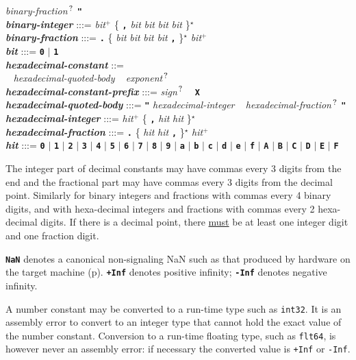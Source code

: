 \documentclass[12pt]{article}
\newcommand{\TT}[1]{{\tt \bfseries #1}}
\newcommand{\STAR}{{\Large $^\star$}}
\newcommand{\PLUS}[1][]{{$^{+#1}$}}
\newcommand{\QMARK}{{$^{\,\mbox{\footnotesize ?}}$}}
\newcommand{\emkey}[1]{{\em \bfseries #1}}
\newcommand{\pagref}[1]{p\pageref{#1}}
\newenvironment{indpar}[1][0.3in]%
	{\begin{list}{}%
		     {\setlength{\itemsep}{0in}%
		      \setlength{\topsep}{0in}%
		      \setlength{\parsep}{1ex}%
		      \setlength{\labelwidth}{#1}%
		      \setlength{\leftmargin}{#1}%
		      \addtolength{\leftmargin}{\labelsep}}%
	 \item}%
	{\end{list}}
\begin{document}
\begin{indpar}
				{\em binary-fraction}\QMARK{} \TT{"}
\\[0.5ex]
\emkey{binary-integer}
    :::= {\em bit}\PLUS{}
           \{ \TT{,} {\em bit} {\em bit} {\em bit} {\em bit} \}\STAR{} \\
\emkey{binary-fraction} :::=
    \TT{.} \{ {\em bit} {\em bit} {\em bit} {\em bit} \TT{,} \}\STAR{}
    {\em bit}\PLUS{} \\
\emkey{bit} :::= \TT{0} $|$ \TT{1}
 \\[0.5ex]
\emkey{hexadecimal-constant} ::= \\
\hspace*{0.5in}{\em hexadecimal-constant-prefix} ~
               {\em hexadecimal-quoted-body} ~
	       {\em exponent}\QMARK{}
\\[0.5ex]
\emkey{hexadecimal-constant-prefix} :::= {\em sign}\QMARK{} ~ \TT{X}
\\[0.5ex]
\emkey{hexadecimal-quoted-body} :::= \TT{"} {\em hexadecimal-integer} ~
				     {\em hexadecimal-fraction}\QMARK{} \TT{"}
\\[0.5ex]
\emkey{hexadecimal-integer}
    :::= {\em hit}\PLUS{}
           \{ \TT{,} {\em hit} {\em hit} \}\STAR{} \\
\emkey{hexadecimal-fraction} :::=
    \TT{.} \{ {\em hit} {\em hit} \TT{,} \}\STAR{}
    {\em hit}\PLUS{} \\
\emkey{hit} :::= \TT{0} $|$ \TT{1} $|$ \TT{2} $|$ \TT{3} $|$ \TT{4}
	     $|$ \TT{5} $|$ \TT{6} $|$ \TT{7} $|$ \TT{8} $|$ \TT{9}
	     $|$ \TT{a} $|$ \TT{b} $|$ \TT{c} $|$ \TT{d} $|$ \TT{e} $|$ \TT{f}
	     $|$ \TT{A} $|$ \TT{B} $|$ \TT{C} $|$ \TT{D} $|$ \TT{E} $|$ \TT{F}
\end{indpar}

The integer part of decimal constants may have commas
every 3 digits from the end and the fractional part may have
commas every 3 digits from the decimal point.
Similarly for binary integers and fractions with commas every 4 binary
digits,
and with hexa-decimal integers and fractions with commas every 2
hexa-decimal digits.
If there is a decimal point, there \underline{must}
be at least one integer digit and
one fraction digit.

\TT{NaN} denotes a canonical non-signaling NaN such
as that produced by hardware on the target machine
(\pagref{NAN}).
\TT{+Inf} denotes positive infinity; \TT{-Inf} denotes negative infinity.

A number constant may be converted to a run-time type such as {\tt int32}.
It is an assembly error to convert to an integer type that cannot
hold the exact value of the number constant.
Conversion to a run-time floating type, such as {\tt flt64}, is however
never an assembly error: if necessary the converted value is
{\tt +Inf} or {\tt -Inf}.
\end{document}
